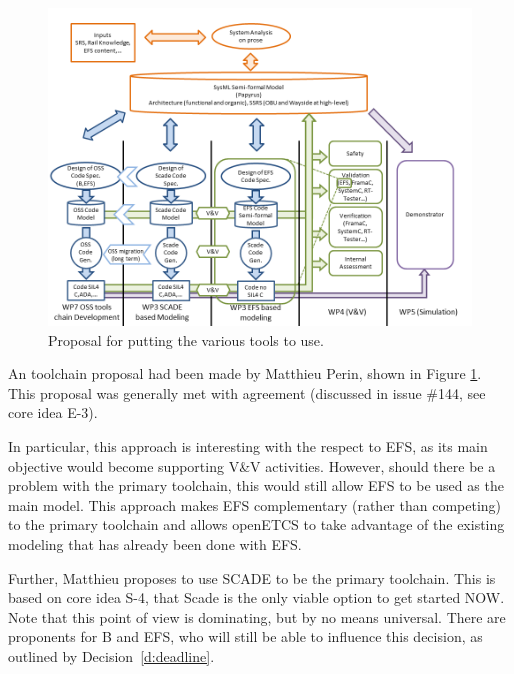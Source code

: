 \begin{figure}
  \centering
  \includegraphics[width=\linewidth]{images/2013_08_28_Toolchain_proposal.png}
  \caption{Proposal for putting the various tools to use.}
  \label{fig:proposal}
\end{figure}

An toolchain proposal had been made by Matthieu Perin, shown in Figure \ref{fig:proposal}.  This proposal was generally met with agreement (discussed in issue \#144, see core idea E-3).

In particular, this approach is interesting with the respect to EFS, as its main objective would become supporting V\&V activities.  However, should there be a problem with the primary toolchain, this would still allow EFS to be used as the main model.  This approach makes EFS complementary (rather than competing) to the primary toolchain and allows openETCS to take advantage of the existing modeling that has already been done with EFS.


Further, Matthieu proposes to use SCADE to be the primary toolchain.  This is based on core idea S-4, that Scade is the only viable option to get started NOW.  Note that this point of view is dominating, but by no means universal.  There are proponents for B and EFS, who will still be able to influence this decision, as outlined by Decision~\ref{d:deadline}.

